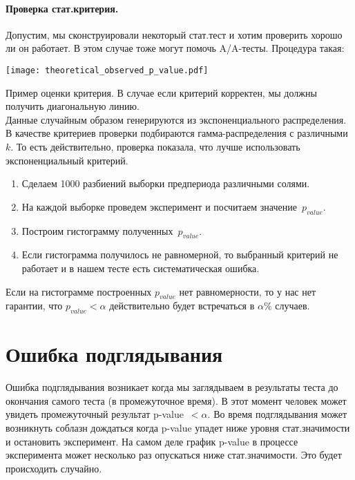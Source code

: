 \documentclass[../handbook.tex]{subfiles}
\begin{document}
\paragraph{Проверка стат.критерия.}
Допустим, мы сконструировали некоторый
стат.тест и хотим проверить хорошо ли он работает. В этом случае тоже могут
помочь A\slash A-тесты. Процедура такая:
\begin{marginfigure}
    \texttt{[image: theoretical\_observed\_p\_value.pdf]}
    \caption{Пример оценки критерия. В случае если критерий корректен, мы
        должны получить диагональную линию. \\
        Данные случайным образом генерируются из экспоненциального
        распределения. В качестве критериев проверки подбираются
        гамма-распределения с различными~$k$. То есть действительно, проверка
        показала, что лучше использовать экспоненциальный критерий.
    }
\end{marginfigure}
\begin{enumerate}
    \item Сделаем 1000 разбиений выборки предпериода различными солями.
    \item На каждой выборке проведем эксперимент и посчитаем значение~$p_{value}$.
    \item Построим гистограмму полученных~$p_{value}$.
    \item Если гистограмма получилось не равномерной, то выбранный критерий не работает и в нашем тесте есть систематическая ошибка. 
\end{enumerate}

Если на гистограмме построенных $p_{value}$ нет равномерности, то у нас нет
гарантии, что $p_{value} < \alpha$ действительно будет встречаться в $\alpha\%$
случаев.



\section{Ошибка подглядывания}
Ошибка подглядывания возникает когда мы заглядываем в результаты теста до
окончания самого теста (в промежуточное время). В этот момент человек может
увидеть промежуточный результат p-value~$< \alpha$. Во время подглядывания
может возникнуть соблазн дождаться когда p-value упадет ниже уровня
стат.значимости и остановить эксперимент. На самом деле график p-value в
процессе эксперимента может несколько раз опускаться ниже стат.значимости. Это
будет происходить случайно.
\end{document}

